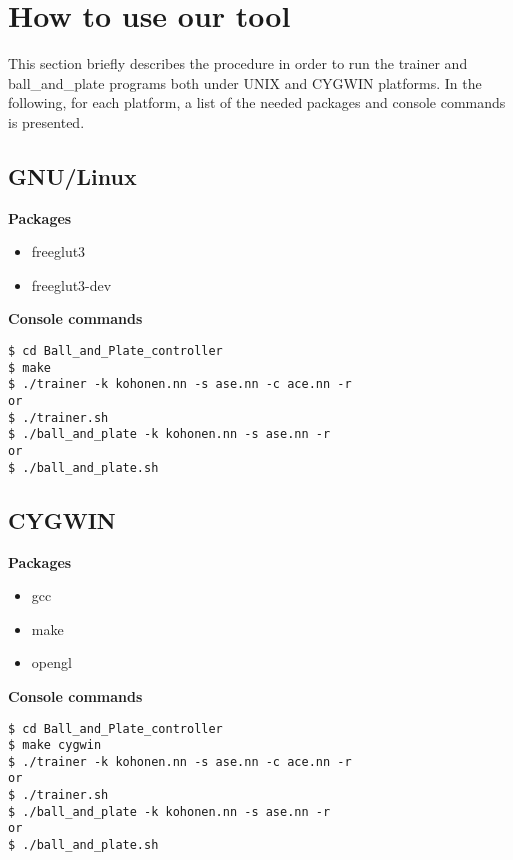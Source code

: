 
\section{How to use our tool}

This section briefly describes the procedure in order to run the trainer and
ball\_and\_plate programs both under UNIX and CYGWIN platforms.
In the following, for each platform, a list of the needed packages and console
commands is presented.

\subsection{GNU/Linux}

\textbf{Packages}

\begin{itemize}
\item freeglut3                                      
\item freeglut3-dev                                 
\end{itemize}

\noindent\textbf{Console commands}

\begin{verbatim}
$ cd Ball_and_Plate_controller
$ make 
$ ./trainer -k kohonen.nn -s ase.nn -c ace.nn -r
or
$ ./trainer.sh
$ ./ball_and_plate -k kohonen.nn -s ase.nn -r
or
$ ./ball_and_plate.sh
\end{verbatim}

\subsection{CYGWIN}

\textbf{Packages}

\begin{itemize}
\item gcc
\item make
\item opengl
\end{itemize}

\noindent\textbf{Console commands}

\begin{verbatim}
$ cd Ball_and_Plate_controller
$ make cygwin
$ ./trainer -k kohonen.nn -s ase.nn -c ace.nn -r
or
$ ./trainer.sh
$ ./ball_and_plate -k kohonen.nn -s ase.nn -r
or
$ ./ball_and_plate.sh
\end{verbatim}

